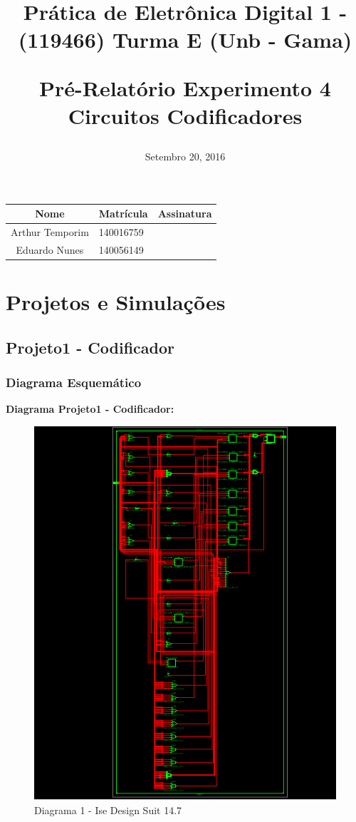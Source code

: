 \documentclass[12pts]{article}
\title{
	Prática de Eletrônica Digital 1 - (119466)
	\singlespacing
		Turma E (Unb - Gama)
	\singlespacing
	\begin{midpage}
	\begin {large}
		Pré-Relatório Experimento 4
		\singlespace
		Circuitos Codificadores
	\end {large}
	\end{midpage}
}
\date{Setembro 20, 2016}
\begin{document}
\maketitle	
\begin{center}

\begin{tabular}{|c|l|r|}
\hline
Nome & Matrícula & Assinatura\\
\hline
Arthur Temporim & 140016759 & \\
\hline	
Eduardo Nunes & 140056149 & \\
\hline	
\end{tabular}

\end{center}

\pagebreak

\section{Projetos e Simulações}
\subsection{Projeto1 - Codificador}
\subsubsection{Diagrama Esquemático}

\textbf{Diagrama Projeto1 - Codificador:}

\begin{figure}[!htb]
  \centering
  \includegraphics[scale=0.7	]{imagens/esquematico_projeto1}
  \caption{Diagrama 1 - Ise Design Suit 14.7}
  \label{figRotulo}
\end{figure}
\end{document}
